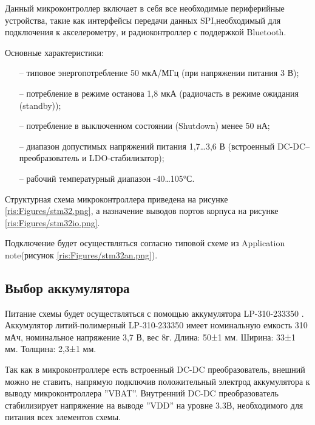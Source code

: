 \begin{sloppypar}
Данный микроконтроллер включает в себя все необходимые периферийные устройства, такие как интерфейсы передачи данных SPI,необходимый для подключения к акселерометру, и радиоконтроллер с поддержкой Bluetooth.

Основные характеристики:
\begin{onehalfspace}
	\begin{itemize}
		\item[--] типовое энергопотребление 50 мкА/МГц (при напряжении питания 3 В);
		\item[--] потребление в режиме останова 1,8 мкА (радиочасть в режиме ожидания (standby));
		\item[--] потребление в выключенном состоянии (Shutdown) менее 50 нА;
		\item[--] диапазон допустимых напряжений питания 1,7…3,6 В (встроенный DC-DC–преобразователь и LDO-стабилизатор);
		\item[--] рабочий температурный диапазон -40…105°С.
	\end{itemize}
\end{onehalfspace}


Структурная схема микроконтроллера приведена на рисунке \ref{ris:Figures/stm32.png}, а назначение выводов портов корпуса на рисунке \ref{ris:Figures/stm32io.png}.



Подключение будет осуществляться согласно типовой схеме из Application note\cite {STM_an}(рисунок \ref{ris:Figures/stm32an.png}).


\subsection{Выбор аккумулятора}
Питание схемы будет осуществляться с помощью аккумулятора LP-310-233350 \cite {li-pol}.
Аккумулятор литий-полимерный LP-310-233350 имеет номинальную емкость 310 мАч, номинальное напряжение 3,7 В, вес 8г. Длина: 50±1 мм. Ширина: 33±1 мм. Толщина: 2,3±1 мм. 

Так как в микроконтроллере есть встроенный DC-DC преобразователь, внешний можно не ставить, напрямую подключив положительный электрод аккумулятора к выводу микроконтроллера ''VBAT''. Внутренний DC-DC преобразователь стабилизирует напряжение на выводе ''VDD'' на уровне 3.3В, необходимого для питания всех элементов схемы.


\end{sloppypar}
